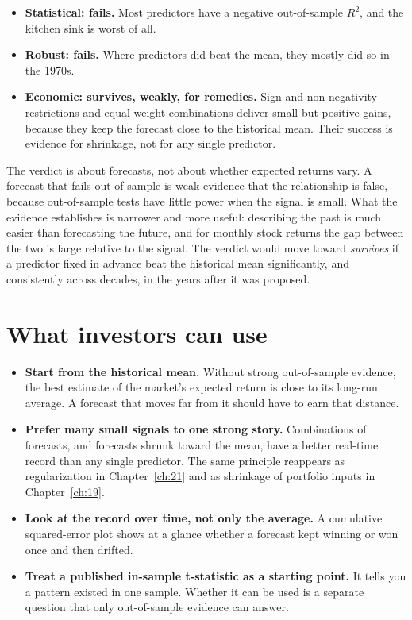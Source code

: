 \begin{itemize}
  \item \textbf{Statistical: fails.} Most predictors have a negative out-of-sample $R^2$, and the kitchen sink is worst of all.
  \item \textbf{Robust: fails.} Where predictors did beat the mean, they mostly did so in the 1970s.
  \item \textbf{Economic: survives, weakly, for remedies.} Sign and non-negativity restrictions and equal-weight combinations deliver small but positive gains, because they keep the forecast close to the historical mean. Their success is evidence for shrinkage, not for any single predictor.
\end{itemize}

The verdict is about forecasts, not about whether expected returns vary. A forecast that fails out of sample is weak evidence that the relationship is false, because out-of-sample tests have little power when the signal is small. What the evidence establishes is narrower and more useful: describing the past is much easier than forecasting the future, and for monthly stock returns the gap between the two is large relative to the signal. The verdict would move toward \emph{survives} if a predictor fixed in advance beat the historical mean significantly, and consistently across decades, in the years after it was proposed.

\section{What investors can use}
\label{sec:05-investors}

\begin{itemize}
  \item \textbf{Start from the historical mean.} Without strong out-of-sample evidence, the best estimate of the market's expected return is close to its long-run average. A forecast that moves far from it should have to earn that distance.
  \item \textbf{Prefer many small signals to one strong story.} Combinations of forecasts, and forecasts shrunk toward the mean, have a better real-time record than any single predictor. The same principle reappears as regularization in Chapter~\ref{ch:21} and as shrinkage of portfolio inputs in Chapter~\ref{ch:19}.
  \item \textbf{Look at the record over time, not only the average.} A cumulative squared-error plot shows at a glance whether a forecast kept winning or won once and then drifted.
  \item \textbf{Treat a published in-sample t-statistic as a starting point.} It tells you a pattern existed in one sample. Whether it can be used is a separate question that only out-of-sample evidence can answer.
\end{itemize}

